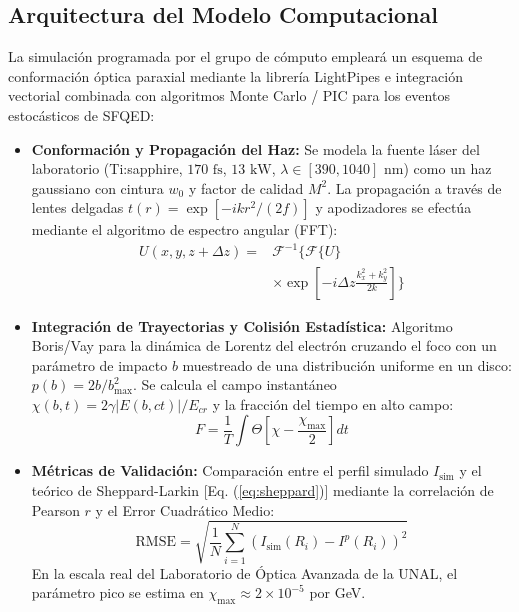 \documentclass[twocolumn, 12pt]{article}
\begin{document}
\subsection{Arquitectura del Modelo Computacional}
La simulación programada por el grupo de cómputo empleará un esquema de conformación óptica paraxial mediante la librería \textsf{LightPipes} e integración vectorial combinada con algoritmos Monte Carlo / PIC para los eventos estocásticos de SFQED:
\begin{itemize}
    \item \textbf{Conformación y Propagación del Haz:} Se modela la fuente láser del laboratorio (Ti:sapphire, $170\text{ fs}$, $13\text{ kW}$, $\lambda \in [390, 1040]\text{ nm}$) como un haz gaussiano con cintura $w_0$ y factor de calidad $M^2$. La propagación a través de lentes delgadas $t(r) = \exp[-i k r^2/(2f)]$ y apodizadores se efectúa mediante el algoritmo de espectro angular (FFT):
    \begin{equation}
    \begin{split}
    U(x,y,z+\Delta z) = & \mathcal{F}^{-1} \Big\{ \mathcal{F}\{U\} \\
    & \times \exp\left[ -i \Delta z \frac{k_x^2 + k_y^2}{2k} \right] \Big\}
    \end{split}
    \end{equation}
    
    \item \textbf{Integración de Trayectorias y Colisión Estadística:} Algoritmo Boris/Vay para la dinámica de Lorentz del electrón cruzando el foco con un parámetro de impacto $b$ muestreado de una distribución uniforme en un disco: $p(b) = 2b / b_{\text{max}}^2$. Se calcula el campo instantáneo $\chi(b,t) = 2\gamma |E(b,ct)| / E_{cr}$ y la fracción del tiempo en alto campo:
    \begin{equation}
    F = \frac{1}{T} \int \Theta\left[ \chi - \frac{\chi_{\text{max}}}{2} \right] dt
    \end{equation}
    
    \item \textbf{Métricas de Validación:} Comparación entre el perfil simulado $I_{\text{sim}}$ y el teórico de Sheppard-Larkin [Eq. (\ref{eq:sheppard})] mediante la correlación de Pearson $r$ y el Error Cuadrático Medio:
    \begin{equation}
    \text{RMSE} = \sqrt{ \frac{1}{N} \sum_{i=1}^N \left( I_{\text{sim}}(R_i) - I^p(R_i) \right)^2 }
    \end{equation}
    En la escala real del Laboratorio de Óptica Avanzada de la UNAL, el parámetro pico se estima en $\chi_{\text{max}} \approx 2 \times 10^{-5}$ por GeV.
\end{itemize}
\end{document}
